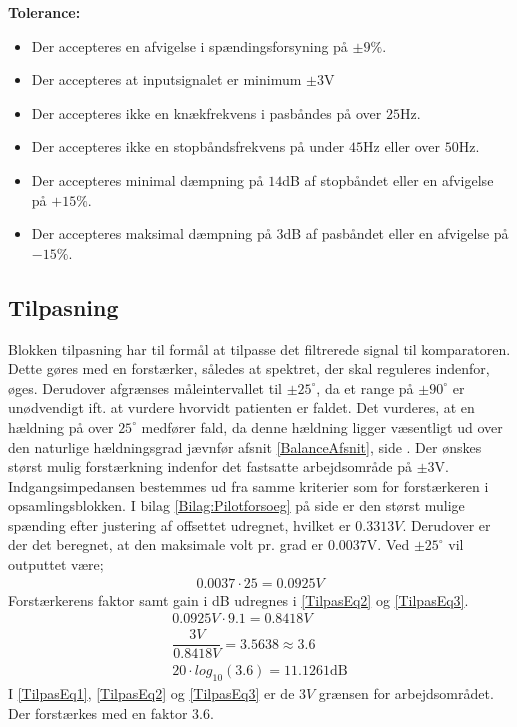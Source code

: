 \noindent \textbf{Tolerance:}
\begin{itemize}
	\item Der accepteres en afvigelse i spændingsforsyning på $\pm9\%$.
	\item Der accepteres at inputsignalet er minimum $\pm3$V
	\item Der accepteres ikke en knækfrekvens i pasbåndes på over $25$Hz.
	\item Der accepteres ikke en stopbåndsfrekvens på under $45$Hz eller over $50$Hz.
	\item Der accepteres minimal dæmpning på $14$dB af stopbåndet eller en afvigelse på $+15\%$.
	\item Der accepteres maksimal dæmpning på $3$dB af pasbåndet eller en afvigelse på $-15\%$.
\end{itemize}
\subsection{Tilpasning}\label{Tilpasningsblok}
Blokken tilpasning har til formål at tilpasse det filtrerede signal til komparatoren. Dette gøres med en forstærker, således at spektret, der skal reguleres indenfor, øges. Derudover afgrænses måleintervallet til $\pm25^{\circ}$, da et range på $\pm90^{\circ}$ er unødvendigt ift. at vurdere hvorvidt patienten er faldet. Det vurderes, at en hældning på over $25^{\circ}$ medfører fald, da denne hældning ligger væsentligt ud over den naturlige hældningsgrad jævnfør afsnit \ref{BalanceAfsnit}, side \pageref{BalanceAfsnit}. Der ønskes størst mulig forstærkning indenfor det fastsatte arbejdsområde på $\pm3$V. Indgangsimpedansen bestemmes ud fra samme kriterier som for forstærkeren i opsamlingsblokken. I bilag \ref{Bilag:Pilotforsoeg} på side \pageref{Bilag:Pilotforsoeg} er den størst mulige spænding efter justering af offsettet udregnet, hvilket er $0.3313V$. Derudover er der det beregnet, at den maksimale volt pr. grad er $0.0037$V. Ved $\pm25^{\circ}$ vil outputtet være;
\begin{align}
\label{Udreg3} 0.0037 \cdot 25 = 0.0925V
\end{align}
Forstærkerens faktor samt gain i dB udregnes i \eqref{TilpasEq2} og \eqref{TilpasEq3}.
\begin{align}
\label{TilpasEq1} 0.0925V \cdot 9.1 = 0.8418V \\
\label{TilpasEq2} \dfrac{3V}{0.8418V} = 3.5638 \approx 3.6 \\
\label{TilpasEq3} 20 \cdot log_{10} (3.6) = 11.1261\text{dB}
\end{align} 
I \eqref{TilpasEq1}, \eqref{TilpasEq2} og \eqref{TilpasEq3} er de $3V$ grænsen for arbejdsområdet. Der forstærkes med en faktor $3.6$. \\


